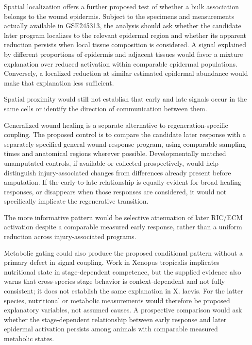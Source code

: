 \documentclass[11pt]{article}
\begin{document}
Spatial localization offers a further proposed test of whether a bulk association belongs to the wound epidermis. Subject to the specimens and measurements actually available in GSE245313, the analysis should ask whether the candidate later program localizes to the relevant epidermal region and whether its apparent reduction persists when local tissue composition is considered. A signal explained by different proportions of epidermis and adjacent tissues would favor a mixture explanation over reduced activation within comparable epidermal populations. Conversely, a localized reduction at similar estimated epidermal abundance would make that explanation less sufficient.

Spatial proximity would still not establish that early and late signals occur in the same cells or identify the direction of communication between them.

Generalized wound healing is a separate alternative to regeneration-specific coupling. The proposed control is to compare the candidate later response with a separately specified general wound-response program, using comparable sampling times and anatomical regions wherever possible. Developmentally matched unamputated controls, if available or collected prospectively, would help distinguish injury-associated changes from differences already present before amputation. If the early-to-late relationship is equally evident for broad healing responses, or disappears when those responses are considered, it would not specifically implicate the regenerative transition.

The more informative pattern would be selective attenuation of later RIC/ECM activation despite a comparable measured early response, rather than a uniform reduction across injury-associated programs.

Metabolic gating could also produce the proposed conditional pattern without a primary defect in signal coupling. Work in Xenopus tropicalis implicates nutritional state in stage-dependent competence, but the supplied evidence also warns that cross-species stage behavior is context-dependent and not fully consistent; it does not establish the same explanation in X. laevis. For the latter species, nutritional or metabolic measurements would therefore be proposed explanatory variables, not assumed causes. A prospective comparison would ask whether the stage-dependent relationship between early response and later epidermal activation persists among animals with comparable measured metabolic states.
\end{document}
